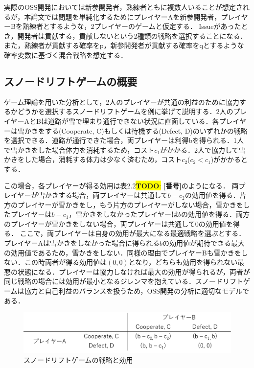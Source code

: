 \documentclass[11pt]{jreport}
\newcommand{\todo}[1]{\colorbox{yellow}{{\bf TODO}:}{\color{red} {\textbf{[#1]}}}}
\begin{document}
実際のOSS開発においては新参開発者，熟練者ともに複数人いることが想定されるが，本論文では問題を単純化するためにプレイヤーAを新参開発者，プレイヤーBを熟練者とするような，2プレイヤーのゲームと仮定する．
Issueがあったとき，開発者は貢献する，貢献しないという2種類の戦略を選択することになる．
また，熟練者が貢献する確率をp，新参開発者が貢献する確率をqとするような確率変数に基づく混合戦略を想定する．

\subsection{スノードリフトゲームの概要 }
ゲーム理論を用いた分析として，2人のプレイヤーが共通の利益のために協力するかどうかを選択するスノードリフトゲームを例に挙げて説明する．2人のプレイヤーAとBは道路が雪で埋まり通行できない状況に直面している．各プレイヤーは雪かきをする(Cooperate, C)もしくは待機する(Defect, D)のいずれかの戦略を選択できる．道路が通行できた場合，両プレイヤーは利得bを得られる．1人で雪かきをした場合体力を消耗するため，コスト$c_1$がかかる．2人で協力して雪かきをした場合，消耗する体力は少なく済むため，コスト$c_2$($c_2 < c_1$)がかかるとする．

この場合，各プレイヤーが得る効用は表2.2\todo{番号}のようになる．
両プレイヤーが雪かきする場合，両プレイヤーは共通して$b - c_2$の効用値を得る．片方のプレイヤーが雪かきをし，もう片方のプレイヤーがしない場合，雪かきをしたプレイヤーは$b - c_1$，雪かきをしなかったプレイヤーは$b$の効用値を得る．両方のプレイヤーが雪かきをしない場合，両プレイヤーは共通して$0$の効用値を得る．
ここで，両プレイヤーは自身の効用が最大になる最適戦略を選ぶとする．プレイヤーAは雪かきをしなかった場合に得られる$b$の効用値が期待できる最大の効用値であるため，雪かきをしない．同様の理由でプレイヤーBも雪かきをしない．この時両者が得る効用値は$(0, 0)$となり，どちらも効用を得られない最悪の状態になる．プレイヤーは協力しなければ最大の効用が得られるが，両者が同じ戦略の場合には効用が最小となるジレンマを抱えている．スノードリフトゲームは協力と自己利益のバランスを扱うため，OSS開発の分析に適切なモデルである．
\begin{figure}[t]
\centerline{\includegraphics[width=0.9\linewidth]{@BSthesis2024_Nakai/BSthesis2024_Nakai_fig/snowdrift.png}}
\caption{スノードリフトゲームの戦略と効用}
\label{fig:milestone}
\end{figure}
\end{document}
